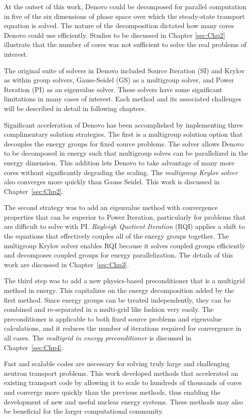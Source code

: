 At the outset of this work, Denovo could be decomposed for parallel computation in five of the six dimensions of phase space over which the steady-state transport equation is solved. The nature of the decomposition dictated how many cores Denovo could use efficiently. Studies to be discussed in Chapter \ref{sec:Chp2} illustrate that the number of cores was not sufficient to solve the real problems of interest. 

The original suite of solvers in Denovo included Source Iteration (SI) and Krylov as within group solvers, Gauss-Seidel (GS) as a multigroup solver, and Power Iteration (PI) as an eigenvalue solver. These solvers have some significant limitations in many cases of interest. Each method and its associated challenges will be described in detail in following chapters. 

Significant acceleration of Denovo has been accomplished by implementing three complimentary solution strategies. The first is a multigroup solution option that decouples the energy groups for fixed source problems. The solver allows Denovo to be decomposed in energy such that multigroup solves can be parallelized in the energy dimension. This addition lets Denovo to take advantage of many more cores without significantly degrading the scaling. The \emph{multigroup Krylov solver} also converges more quickly than Gauss Seidel. This work is discussed in Chapter~\ref{sec:Chp2}.

The second strategy was to add an eigenvalue method with convergence properties that can be superior to Power Iteration, particularly for problems that are difficult to solve with PI. \emph{Rayleigh Quotient Iteration} (RQI) applies a shift to the equations that effectively couples all of the energy groups together. The multigroup Krylov solver enables RQI because it solves coupled groups efficiently and decomposes coupled groups for energy parallelization. The details of this work are discussed in Chapter~\ref{sec:Chp3}.

The third step was to add a new physics-based preconditioner that is a multigrid method in energy. This capitalizes on the energy decomposition added by the first method. Since energy groups can be treated independently, they can be combined and re-separated in a multi-grid like fashion very easily. The preconditioner is applicable to both fixed source problems and eigenvalue calculations, and it reduces the number of iterations required for convergence in all cases. The \emph{multigrid in energy preconditioner} is discussed in Chapter~\ref{sec:Chp4}.

Fast and scalable codes are necessary for solving truly large and challenging neutron transport problems. This work developed methods that accelerated an existing transport code by allowing it to scale to hundreds of thousands of cores and converge more quickly than the previous methods, thus enabling the development of new and useful nuclear energy systems. These methods may also be beneficial for the larger computational community.  
